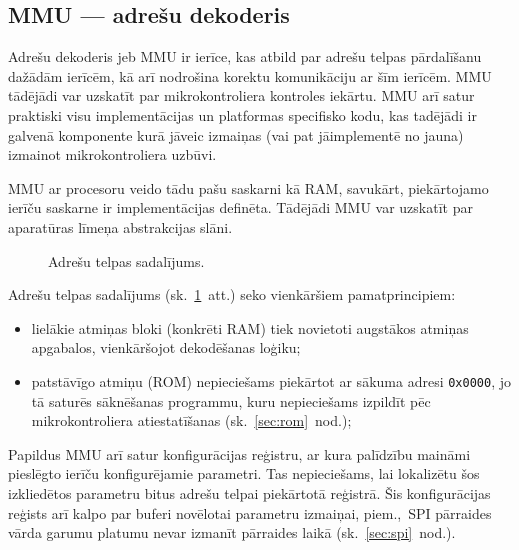 

\subsection{MMU — adrešu dekoderis} \label{sec:mmu}
	Adrešu dekoderis jeb MMU ir ierīce, kas atbild par adrešu telpas
	pārdalīšanu dažādām ierīcēm, kā arī nodrošina korektu komunikāciju
	ar šīm ierīcēm. MMU tādējādi var uzskatīt par mikrokontroliera kontroles
	iekārtu. MMU arī satur praktiski visu implementācijas un platformas
	specifisko kodu, kas tadējādi ir galvenā komponente kurā jāveic izmaiņas
	(vai pat jāimplementē no jauna) izmainot mikrokontroliera uzbūvi.
	
	MMU ar procesoru veido tādu pašu saskarni kā RAM,
	savukārt, piekārtojamo ierīču saskarne ir implementācijas definēta.
	Tādējādi MMU var uzskatīt par aparatūras līmeņa abstrakcijas slāni.
	
	\begin{figure}[thp]
		\centering
		\def\svgwidth{0.9\textwidth}
		{\ttfamily\small}
		\caption{Adrešu telpas sadalījums.}
		\label{fig:memory-map}
	\end{figure}
	
	Adrešu telpas sadalījums (sk.~\ref{fig:memory-map}~att.) seko vienkāršiem pamatprincipiem:
	\begin{itemize}
		\item lielākie atmiņas bloki (konkrēti RAM) tiek novietoti augstākos
			atmiņas apgabalos, vienkāršojot dekodēšanas loģiku;
		\item patstāvīgo atmiņu (ROM) nepieciešams piekārtot ar sākuma
			adresi \texttt{0x0000}, jo tā saturēs sāknēšanas programmu,
			kuru nepieciešams izpildīt pēc mikrokontroliera atiestatīšanas
			(sk.~\ref{sec:rom}~nod.);
	\end{itemize}
	
	Papildus MMU arī satur konfigurācijas reģistru,
	ar kura palīdzību maināmi pieslēgto ierīču konfigurējamie parametri.
	Tas nepieciešams, lai lokalizētu šos izkliedētos parametru bitus
	adrešu telpai piekārtotā reģistrā. Šis konfigurācijas reģists arī kalpo
	par buferi novēlotai parametru izmaiņai, piem.,~SPI pārraides vārda garumu
	platumu nevar izmanīt pārraides laikā (sk.~\ref{sec:spi}~nod.).
	


